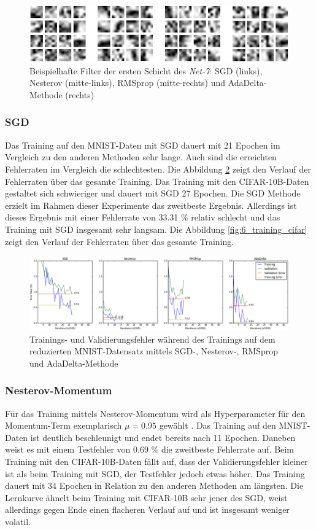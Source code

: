\begin{figure}
\centering
\includegraphics[width=0.7\linewidth]{images/6_filters_cifar}
\caption[]{Beispielhafte Filter der ersten Schicht des \textit{Net-7}: SGD (links), Nesterov (mitte-links), RMSprop (mitte-rechts) und AdaDelta-Methode (rechts)}
\label{fig:6_filters_cifar}
\end{figure}


\subsubsection{SGD}
Das Training auf den MNIST-Daten mit SGD dauert mit 21 Epochen im Vergleich zu den anderen Methoden sehr lange. Auch sind die erreichten Fehlerraten im Vergleich die schlechtesten. Die Abbildung \ref{fig:6_training_mnist} zeigt den Verlauf der Fehlerraten über das gesamte Training. 
Das Training mit den CIFAR-10B-Daten gestaltet sich schwieriger und dauert mit SGD 27 Epochen. Die SGD Methode erzielt im Rahmen dieser Experimente das zweitbeste Ergebnis. Allerdings ist dieses Ergebnis mit einer Fehlerrate von 33.31 \% relativ schlecht und das Training mit SGD insgesamt sehr langsam. Die Abbildung \ref{fig:6_training_cifar} zeigt den Verlauf der Fehlerraten über das gesamte Training.

\begin{figure}
\centering
\includegraphics[width=1.0\linewidth]{images/6_training_mnist_2}
\caption[]{Trainings- und Validierungsfehler während des Trainings auf dem reduzierten MNIST-Datensatz mittels SGD-, Nesterov-, RMSprop und AdaDelta-Methode}
\label{fig:6_training_mnist}
\end{figure}


\subsubsection{Nesterov-Momentum}
Für das Training mittels Nesterov-Momentum wird als Hyperparameter für den Momentum-Term exemplarisch $\mu = 0.95$ gewählt \cite[vgl.][]{Sutskever2013}.
Das Training auf den MNIST-Daten ist deutlich beschleunigt und endet bereits nach 11 Epochen. Daneben weist es mit einem Testfehler von 0.69 \% die zweitbeste Fehlerrate auf.  
Beim Training mit den CIFAR-10B-Daten fällt auf, dass der Validierungsfehler kleiner ist als beim Training mit SGD, der Testfehler jedoch etwas höher. Das Training dauert mit 34 Epochen in Relation zu den anderen Methoden am längsten. Die Lernkurve ähnelt beim Training mit CIFAR-10B sehr jener des SGD, weist allerdings gegen Ende einen flacheren Verlauf auf und ist insgesamt weniger volatil.


